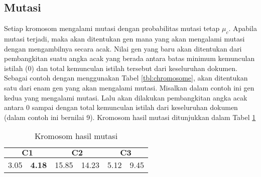 \subsection{Mutasi}
Setiap kromosom mengalami mutasi dengan probabilitas mutasi tetap $\mu_c$. Apabila mutasi terjadi, maka akan ditentukan gen mana yang akan mengalami mutasi dengan mengambilnya secara acak. Nilai gen yang baru akan ditentukan dari pembangkitan suatu angka acak yang berada antara batas minimum kemunculan istilah (0) dan total kemunculan istilah tersebut dari keseluruhan dokumen. Sebagai contoh dengan menggunakan Tabel \ref{tbl:chromosome}, akan ditentukan satu dari enam gen yang akan mengalami mutasi. Misalkan dalam contoh ini gen kedua yang mengalami mutasi. Lalu akan dilakukan pembangkitan angka acak antara 0 sampai dengan total kemunculan istilah dari keseluruhan dokumen (dalam contoh ini bernilai 9). Kromosom hasil mutasi ditunjukkan dalam Tabel \ref{tbl:mutated}

\begin{table}[h]
	\centering
	\begin{tabular}{|c|c|c|c|c|c|}
		\multicolumn{2}{c}{\textbf{$\mathbf{C1}$}} & \multicolumn{2}{c}{\textbf{$\mathbf{C2}$}} & \multicolumn{2}{c}{$\mathbf{C3}$}\\ \hline
		3.05 & {\color{red} \textbf{4.18}} & 15.85 & 14.23 & 5.12 & 9.45\\ \hline
	\end{tabular}
	\caption{Kromosom hasil mutasi}
	\label{tbl:mutated}
\end{table}


%
